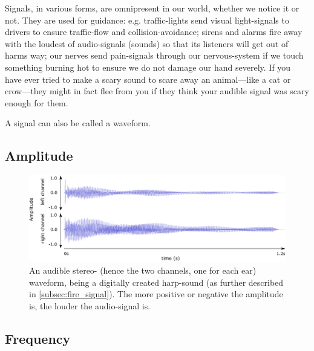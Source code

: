 



Signals, in various forms, are omnipresent in our world, whether we notice it or not. They are used for guidance: e.g. traffic-lights send visual light-signals to drivers to ensure traffic-flow and collision-avoidance; sirens and alarms fire away with the loudest of audio-signals (sounds) so that its listeners will get out of harms way; our nerves send pain-signals through our nervous-system if we touch something burning hot to ensure we do not damage our hand severely. If you have ever tried to make a scary sound to scare away an animal—like a cat or crow—they might in fact flee from you if they think your audible signal was scary enough for them.

A signal can also be called a waveform.

	\subsection{Amplitude}
	\begin{figure}[h!]
		\centering
		\includegraphics[width=\linewidth]{Assets/DocSegments/Chapters/Background/Figures/Illustrations/waveform.pdf}
		\caption[An audible waveform explained.]{An audible stereo- (hence the two channels, one for each ear) waveform, being a digitally created harp-sound (as further described in \ref{subsec:fire_signal}). The more positive or negative the amplitude is, the louder the audio-signal is.}
		\label{fig:waveform}
	\end{figure}


	\subsection{Frequency}
